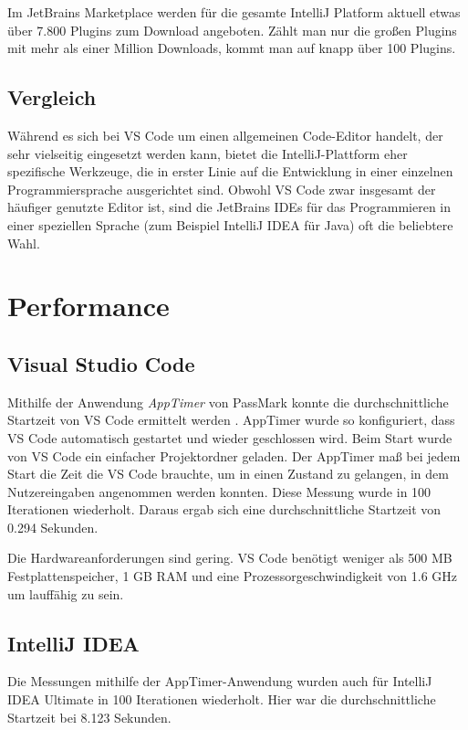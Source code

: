 Im JetBrains Marketplace werden für die gesamte IntelliJ Platform aktuell
etwas über 7.800 Plugins zum Download angeboten. Zählt man nur die 
großen Plugins mit mehr als einer Million Downloads, kommt man auf
knapp über 100 Plugins.

\subsection{Vergleich}

Während es sich bei VS Code um einen allgemeinen Code-Editor handelt,
der sehr vielseitig eingesetzt werden kann, bietet die IntelliJ-Plattform
eher spezifische Werkzeuge, die in erster Linie auf die Entwicklung in
einer einzelnen Programmiersprache ausgerichtet sind.
Obwohl VS Code zwar insgesamt der häufiger genutzte Editor ist,
sind die JetBrains IDEs für das Programmieren in einer 
speziellen Sprache (zum Beispiel IntelliJ IDEA für Java) oft die
beliebtere Wahl.
    

\section{Performance}
\label{sec:Vergleich_Performance}

\subsection{Visual Studio Code}

Mithilfe der Anwendung \emph{AppTimer} von PassMark konnte
die durchschnittliche Startzeit von VS Code ermittelt werden \cite{PassMarkAppTimer}.
AppTimer wurde so konfiguriert, dass VS Code automatisch gestartet
und wieder geschlossen wird. Beim Start wurde von VS Code ein
einfacher Projektordner geladen. Der AppTimer maß bei jedem Start
die Zeit die VS Code brauchte, um in einen Zustand zu gelangen,
in dem Nutzereingaben angenommen werden konnten.
Diese Messung wurde in 100 Iterationen wiederholt.
Daraus ergab sich eine durchschnittliche Startzeit von 0.294 Sekunden.

Die Hardwareanforderungen sind gering. VS Code benötigt weniger
als 500 MB Festplattenspeicher, 1 GB RAM und eine Prozessorgeschwindigkeit
von 1.6 GHz um lauffähig zu sein.

\subsection{IntelliJ IDEA}

Die Messungen mithilfe der AppTimer-Anwendung wurden auch
für IntelliJ IDEA Ultimate in 100 Iterationen wiederholt.
Hier war die durchschnittliche Startzeit bei 8.123 Sekunden.

